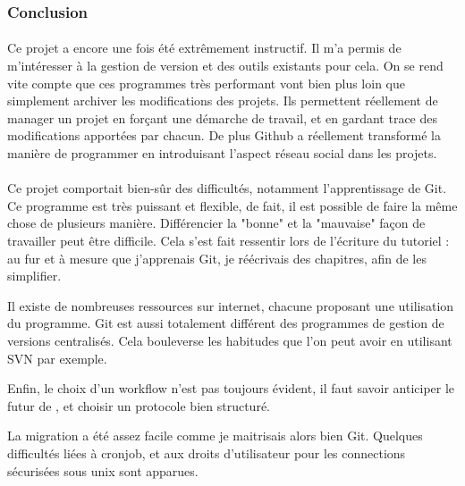 \clearpage

\subsubsection*{Conclusion}

\paragraph*{}
Ce projet a encore une fois été extrêmement instructif.
Il m'a permis de m'intéresser à la gestion de version et des outils existants pour cela.
On se rend vite compte que ces programmes très performant vont bien plus loin que simplement archiver les modifications des projets.
Ils permettent réellement de manager un projet en forçant une démarche de travail, et en gardant trace des modifications apportées par chacun.
De plus Github a réellement transformé la manière de programmer en introduisant l'aspect réseau social dans les projets.

\paragraph*{}
Ce projet comportait bien-sûr des difficultés, notamment l'apprentissage de Git. Ce programme est très puissant et flexible, de fait, il est possible de faire la même chose de plusieurs manière. Différencier la "bonne" et la "mauvaise" façon de travailler peut être difficile. Cela s'est fait ressentir lors de l'écriture du tutoriel : au fur et à mesure que j'apprenais Git, je réécrivais des chapitres, afin de les simplifier.

Il existe de nombreuses ressources sur internet, chacune proposant une utilisation du programme.
Git est aussi totalement différent des programmes de gestion de versions centralisés. Cela bouleverse les habitudes que l'on peut avoir en utilisant SVN par exemple.

Enfin, le choix d'un workflow n'est pas toujours évident, il faut savoir anticiper le futur de {\gofigure}, et choisir un protocole bien structuré. 

La migration a été assez facile comme je maitrisais alors bien Git. Quelques difficultés liées à cronjob, et aux droits d'utilisateur pour les connections sécurisées sous unix sont apparues.






